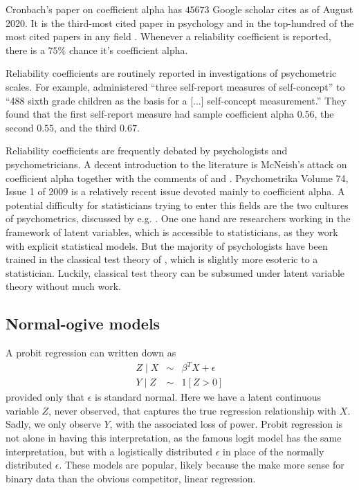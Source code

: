 Cronbach's \citeyear{Cronbach1951-in} paper on coefficient alpha has $45673$ Google scholar cites as of August 2020. It is the third-most cited paper in psychology and in the top-hundred of the most cited papers in any field \parencite{McNeish2018-vu}. Whenever a reliability coefficient is reported, there is a $75\%$ chance it's coefficient alpha.

Reliability coefficients are routinely reported in investigations of psychometric scales. For example, \textcite{Marx1978-rf} administered \enquote{three self-report measures of self-concept} to \enquote{488 sixth grade children as the basis for a [...] self-concept measurement.} They found that the first self-report measure had sample coefficient alpha $0.56$, the second $0.55$, and the third $0.67$. 

Reliability coefficients are frequently debated by psychologists and psychometricians. A decent introduction to the literature is McNeish's \citeyear{McNeish2018-vu} attack on coefficient alpha together with the comments of \textcite{Raykov2019-yr} and \textcite{Savalei2019-se}. Psychometrika Volume 74, Issue 1 of 2009 is a relatively recent issue devoted mainly to coefficient alpha. A potential difficulty for statisticians trying to enter this fields are the two cultures of psychometrics, discussed by e.g. \textcite{Borsboom2005-iq}. One one hand are researchers working in the framework of latent variables, which is accessible to statisticians, as they work with explicit statistical models. But the majority of psychologists have been trained in the classical test theory of \textcite{Lord1968-ax}, which is slightly more esoteric to a statistician. Luckily, classical test theory can be subsumed under latent variable theory without much work.

\subsection{Normal-ogive models}
\label{subsec:Normal-ogive models}

A probit regression can written down as
\begin{eqnarray*}
Z\mid X & \sim & \beta^{T}X+\epsilon\\
Y\mid Z & \sim & 1[Z>0]
\end{eqnarray*}
provided only that $\epsilon$ is standard normal. Here we have a latent continuous variable $Z$, never observed, that captures the true regression relationship with $X$. Sadly, we only observe $Y$, with the associated loss of power. Probit regression is not alone in having this interpretation, as the famous logit model has the same interpretation, but with a logistically distributed $\epsilon$ in place of the normally distributed $\epsilon$. These models are popular, likely because the make more sense for binary data than the obvious competitor, linear regression.

